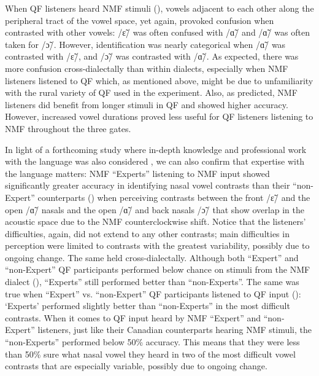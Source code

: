 \documentclass[output=paper,colorlinks,citecolor=brown]{langscibook}
\begin{document}
When QF listeners heard NMF stimuli (), vowels adjacent to each other along the peripheral tract of the vowel space, yet again, provoked confusion when contrasted with other vowels: /ɛ̃/ was often confused with /ɑ̃/ and /ɑ̃/ was often taken for /ɔ̃/. However, identification was nearly categorical when /ɑ̃/ was contrasted with /ɛ̃/, and /ɔ̃/ was contrasted with /ɑ̃/. As expected, there was more confusion cross-dialectally than within dialects, especially when NMF listeners listened to QF which, as mentioned above, might be due to unfamiliarity with the rural variety of QF used in the experiment. Also, as predicted, NMF listeners did benefit from longer stimuli in QF and showed higher accuracy. However, increased vowel durations proved less useful for QF listeners listening to NMF throughout the three gates.

In light of a forthcoming study where in-depth knowledge and professional work with the language was also considered \citep{nicholas_role_review}, we can also confirm that expertise with the language matters: NMF ``Experts'' listening to NMF input showed significantly greater accuracy in identifying nasal vowel contrasts than their ``non-Expert'' counterparts () when perceiving contrasts between the front /ɛ̃/ and the open /ɑ̃/ nasals and the open /ɑ̃/ and back nasals /ɔ̃/ that show overlap in the acoustic space due to the NMF counterclockwise shift. Notice that the listeners’ difficulties, again, did not extend to any other contrasts; main difficulties in perception were limited to contrasts with the greatest variability, possibly due to ongoing change.
The same held cross-dialectally. Although both ``Expert'' and ``non-Expert'' QF participants performed below chance on stimuli from the NMF dialect (), ``Experts'' still performed better than ``non-Experts''. The same was true when ``Expert'' vs. ``non-Expert'' QF participants listened to QF input (): ‘Experts’ performed slightly better than ``non-Experts'' in the most difficult contrasts. When it comes to QF input heard by NMF ``Expert'' and ``non-Expert'' listeners, just like their Canadian counterparts hearing NMF stimuli, the ``non-Experts'' performed below 50\% accuracy. This means that they were less than 50\% sure what nasal vowel they heard in two of the most difficult vowel contrasts that are especially variable, possibly due to ongoing change.
\end{document}
